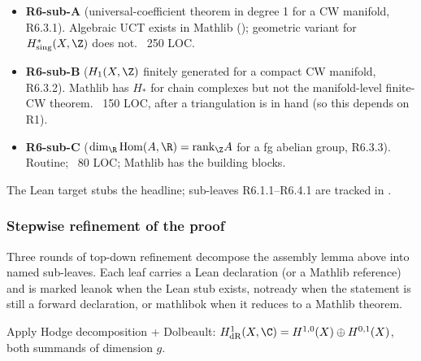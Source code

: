 \begin{itemize}
\item \textbf{R6-sub-A} (universal-coefficient theorem in degree 1
  for a CW manifold, R6.3.1).  Algebraic UCT exists in Mathlib
  ();
  geometric variant for \(H^*_{\mathrm{sing}}(X, \Z)\) does not.
  ~250 LOC.
\item \textbf{R6-sub-B} (\(H_1(X, \Z)\) finitely generated for a
  compact CW manifold, R6.3.2).  Mathlib has \(H_*\) for chain
  complexes but not the manifold-level finite-CW theorem.
  ~150 LOC, after a triangulation is in hand (so this depends on R1).
\item \textbf{R6-sub-C} (\(\dim_\R \mathrm{Hom}(A, \R) = \mathrm{rank}_\Z A\)
  for a fg abelian group, R6.3.3).  Routine; ~80 LOC; Mathlib has
  the building blocks.
\end{itemize}

\begin{lemma}
\label{lem:hodge-deRham-overview-stepwise}
The Lean target 
stubs the headline; sub-leaves R6.1.1--R6.4.1 are tracked in
.
\leanok
\end{lemma}


\subsubsection*{Stepwise refinement of the proof}

Three rounds of top-down refinement decompose the assembly
lemma above into named sub-leaves.  Each leaf carries a Lean
declaration (or a Mathlib reference) and is marked
\textsf{leanok} when the Lean stub exists, \textsf{notready}
when the statement is still a forward declaration, or
\textsf{mathlibok} when it reduces to a Mathlib theorem.

\begin{lemma}[Hodge / de Rham step 1: $\dim_{\C} H^{1}_{\mathrm{dR}}(X) = 2g$]
\label{lem:hodge-deRham-dim-h1-dR}
Apply Hodge decomposition + Dolbeault: $H^{1}_{\mathrm{dR}}(X, \C) = H^{1,0}(X) \oplus H^{0,1}(X)$, both summands of dimension $g$.
\leanok
\end{lemma}


